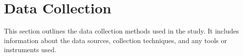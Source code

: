 \section{Data Collection}

This section outlines the data collection methods used in the study. It includes information about the data sources, collection techniques, and any tools or instruments used.